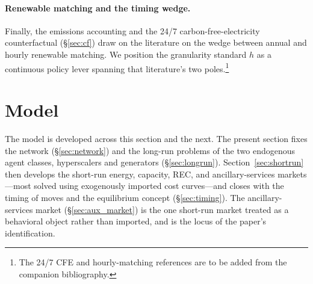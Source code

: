\documentclass[12pt,letterpaper]{article}
\begin{document}
\paragraph{Renewable matching and the timing wedge.} Finally, the emissions
accounting and the 24/7 carbon-free-electricity counterfactual
(\S\ref{sec:cf}) draw on the literature on the wedge between annual and hourly
renewable matching. We position the granularity standard $h$ as a continuous
policy lever spanning that literature's two poles.\footnote{The 24/7 CFE and
hourly-matching references are to be added from the companion bibliography.}


\section{Model}
\label{sec:model}

The model is developed across this section and the next. The present section
fixes the network (\S\ref{sec:network}) and the long-run problems of the two
endogenous agent classes, hyperscalers and generators (\S\ref{sec:longrun}).
Section~\ref{sec:shortrun} then develops the short-run energy, capacity, REC,
and ancillary-services markets---most solved using exogenously imported cost
curves---and closes with the timing of moves and the equilibrium concept
(\S\ref{sec:timing}). The ancillary-services market (\S\ref{sec:aux_market}) is
the one short-run market treated as a behavioral object rather than imported,
and is the locus of the paper's identification.
\end{document}
